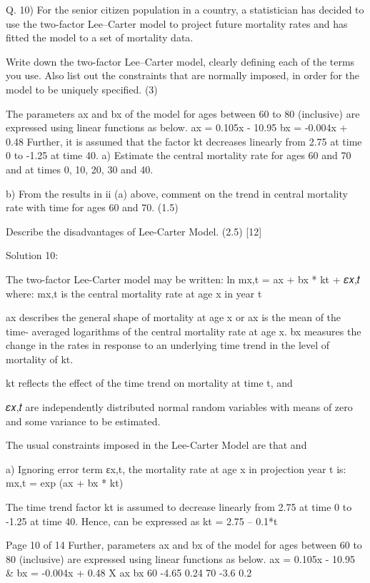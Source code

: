 Q. 10)
For the senior citizen population in a country, a statistician has decided to use the two-factor Lee–Carter model to project future mortality rates and has fitted the model to a set of mortality data.
\item  Write down the two-factor Lee–Carter model, clearly defining each of the terms you use. Also list out the constraints that are normally imposed, in order for the model to be uniquely specified.
(3)
\item   The parameters ax and bx of the model for ages between 60 to 80 (inclusive) are expressed using linear functions as below.
ax = 0.105x - 10.95
bx = -0.004x + 0.48
Further, it is assumed that the factor kt decreases linearly from 2.75 at time 0 to -1.25 at time 40.
a) Estimate the central mortality rate for ages 60 and 70 and at times 0, 10, 20, 30 and 40.

b) From the results in ii (a) above, comment on the trend in central mortality rate with time for ages 60 and 70.
(1.5)
\item   Describe the disadvantages of Lee-Carter Model.
(2.5)
[12]


Solution 10:
\item 
The two-factor Lee-Carter model may be written:
ln mx,t = ax + bx * kt + 𝜀𝑥,𝑡
where:
mx,t is the central mortality rate at age x in year t

ax describes the general shape of mortality at age x or ax is the mean of the time- averaged logarithms of the central mortality rate at age x. 
bx measures the change in the rates in response to an underlying time trend in the level of mortality of kt.

kt reflects the effect of the time trend on mortality at time t, and

𝜀𝑥,𝑡 are independently distributed normal random variables with means of zero and some variance to be estimated.

The usual constraints imposed in the Lee-Carter Model are that 
and


\item  
a) Ignoring error term εx,t, the mortality rate at age x in projection year t is:
mx,t = exp (ax + bx * kt)

The time trend factor kt is assumed to decrease linearly from 2.75 at time 0 to -1.25 at time 40. Hence, can be expressed as
kt = 2.75 – 0.1*t

Page 10 of 14
Further, parameters ax and bx of the model for ages between 60 to 80 (inclusive) are expressed using linear functions as below.
ax = 0.105x - 10.95 &
bx = -0.004x + 0.48
X
ax
bx
60
-4.65
0.24
70
-3.6
0.2

